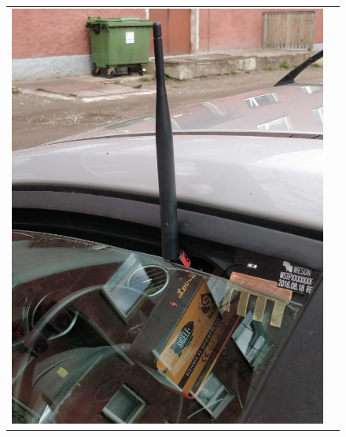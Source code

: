 \documentclass[12pt]{article}
\begin{document}
    \begin{figure}[h]
        \begin{center}
        \begin{tabular}{c c}
            \begin{minipage}{0.4\textwidth}
                \includegraphics[width=\textwidth]{figures/fipyautos2.jpg}
            \end{minipage}
            &
            \begin{minipage}{0.4\textwidth}

\end{minipage}
\end{tabular}
\end{center}
\end{figure}
\end{document}
